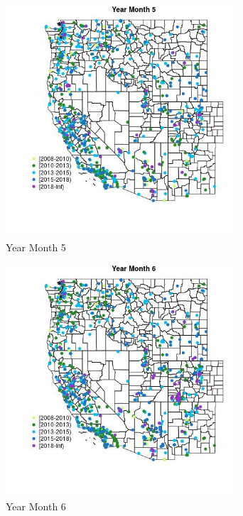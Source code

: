 \begin{figure} 
\centering  
\includegraphics[width=0.77\textwidth]{Code_Outputs/Report_ML_input_PM25_Step4_part_e_de_duplicated_aveswNAs_MapObsMo5Year.jpg} 
\caption{\label{fig:Report_ML_input_PM25_Step4_part_e_de_duplicated_aveswNAsMapObsMo5Year}Year Month 5} 
\end{figure} 
 

\begin{figure} 
\centering  
\includegraphics[width=0.77\textwidth]{Code_Outputs/Report_ML_input_PM25_Step4_part_e_de_duplicated_aveswNAs_MapObsMo6Year.jpg} 
\caption{\label{fig:Report_ML_input_PM25_Step4_part_e_de_duplicated_aveswNAsMapObsMo6Year}Year Month 6} 
\end{figure} 
 

